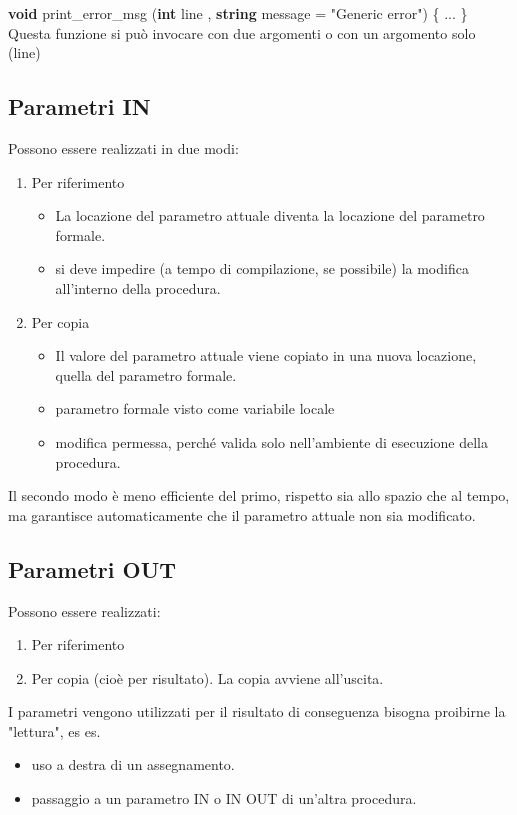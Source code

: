 \documentclass[10pt]{article}
\begin{document}
\textbf{void} print\_error\_msg (\textbf{int} line , \textbf{string} message = "Generic error")
\{ ... \}\\

Questa funzione si può invocare con due argomenti o con un argomento solo (line)
\subsection{Parametri IN}
Possono essere realizzati in due modi:
\begin{enumerate}
    \item Per riferimento
    \begin{itemize}
        \item La locazione del parametro attuale diventa la locazione del parametro formale.
        \item si deve impedire (a tempo di compilazione, se possibile) la modifica all'interno della procedura.
    \end{itemize}
    \item Per copia
    \begin{itemize}
        \item Il valore del parametro attuale viene copiato in una nuova locazione, quella del parametro formale.
        \item parametro formale visto come variabile locale
        \item modifica permessa, perché valida solo nell'ambiente di esecuzione della procedura.
    \end{itemize}
\end{enumerate}
Il secondo modo è meno efficiente del primo, rispetto sia allo spazio che al tempo, ma garantisce automaticamente che il parametro attuale non sia modificato.
\subsection{Parametri OUT}
Possono essere realizzati:
\begin{enumerate}
    \item Per riferimento
    \item Per copia (cioè per risultato). La copia avviene all'uscita.
\end{enumerate}
I parametri vengono utilizzati per il risultato di conseguenza bisogna proibirne la "lettura", es es.
\begin{itemize}
    \item uso a destra di un assegnamento.
    \item passaggio a un parametro IN o IN OUT di un'altra procedura.
\end{itemize}
\end{document}
